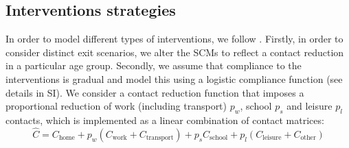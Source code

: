 \documentclass{article}
\newcommand{\chome}{C_{\text{home}}}
\newcommand{\cwork}{C_{\text{work}}}
\newcommand{\ctransport}{C_{\text{transport}}}
\newcommand{\cschool}{C_{\text{school}}}
\newcommand{\cleisure}{C_{\text{leisure}}}
\newcommand{\cother}{C_{\text{other}}}
\begin{document}
\subsection{Interventions strategies}
\label{sec:interventions}
In order to model different types of interventions, we follow \citet{abrams2021modelling}. Firstly, in order to consider distinct exit scenarios, we alter the SCMs to reflect a contact reduction in a particular age group. Secondly, we assume that compliance to the interventions is gradual and model this using a logistic compliance function (see details in SI).
We consider a contact reduction function that imposes a proportional reduction of work (including transport) $p_w$, school $p_s$ and leisure $p_l$ contacts, which is implemented as a linear combination of contact matrices:
\begin{equation}
\label{eq:scm}
    \hat{C} = \chome + p_w (\cwork + \ctransport) + p_s \cschool + p_l (\cleisure + \cother)
\end{equation}
\end{document}
